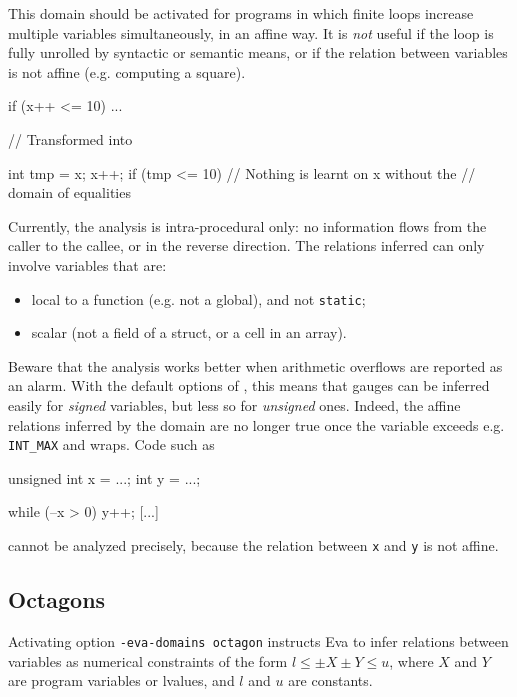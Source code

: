\documentclass{frama-c-book}
\begin{document}
This domain should be activated for programs in which finite loops
increase multiple variables simultaneously, in an affine way. It
is \emph{not} useful if the loop is fully unrolled by syntactic or
semantic means, or if the relation between
variables is not affine (e.g. computing a square).

\begin{listing-nonumber}
  if (x++ <= 10) { ... }

// Transformed into

  int tmp = x;
  x++;
  if (tmp <= 10) { // Nothing is learnt on x without the
                   // domain of equalities }
\end{listing-nonumber}

Currently, the analysis is intra-procedural only: no information
flows from the caller to the callee, or in the reverse direction.
The relations inferred can only involve variables that are:
\begin{itemize}
\item local to a function (e.g. not a global), and not \texttt{static};
\item scalar (not a field of a struct, or a cell in an array).
\end{itemize}

Beware that the analysis works better when arithmetic overflows
are reported as an alarm. With the default options of \FramaC,
this means that gauges can be inferred easily for \emph{signed}
variables, but less so for \emph{unsigned} ones. Indeed, the affine
relations inferred by the domain are no longer true once the
variable exceeds e.g. \texttt{INT\_MAX} and wraps. Code such as
\begin{listing-nonumber}
unsigned int x = ...;
int y = ...;

while (--x > 0) {
  y++;
  [...]
}
\end{listing-nonumber}
 cannot be analyzed precisely, because the relation between \texttt{x}
and \texttt{y} is not affine.


\subsection{Octagons}
\label{sec:octagons}

Activating option \texttt{-eva-domains octagon} instructs Eva to infer relations
between variables as numerical constraints of the form $l \leq \pm X \pm Y \leq
u$, where $X$ and $Y$ are program variables or lvalues,
and $l$ and $u$ are constants.
\end{document}
